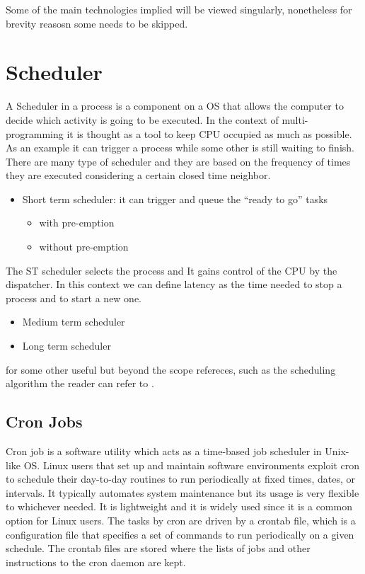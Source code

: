 \documentclass[
  12pt,
  a4paper,
  oneside]{book}
\providecommand{\tightlist}{%
  \setlength{\itemsep}{0pt}\setlength{\parskip}{0pt}}
\begin{document}
Some of the main technologies implied will be viewed singularly, nonetheless for brevity reasosn some needs to be skipped.

\hypertarget{scheduler}{%
\section{Scheduler}\label{scheduler}}

A Scheduler in a process is a component on a OS that allows the computer to decide which activity is going to be executed. In the context of multi-programming it is thought as a tool to keep CPU occupied as much as possible. As an example it can trigger a process while some other is still waiting to finish. There are many type of scheduler and they are based on the frequency of times they are executed considering a certain closed time neighbor.

\begin{itemize}
\tightlist
\item
  Short term scheduler: it can trigger and queue the ``ready to go'' tasks

  \begin{itemize}
  \tightlist
  \item
    with pre-emption
  \item
    without pre-emption
  \end{itemize}
\end{itemize}

The ST scheduler selects the process and It gains control of the CPU by the dispatcher. In this context we can define latency as the time needed to stop a process and to start a new one.

\begin{itemize}
\tightlist
\item
  Medium term scheduler
\item
  Long term scheduler
\end{itemize}

for some other useful but beyond the scope refereces, such as the scheduling algorithm the reader can refer to \citep{wiki:scheduler}.

\hypertarget{cron-jobs}{%
\subsection{Cron Jobs}\label{cron-jobs}}

Cron job is a software utility which acts as a time-based job scheduler in Unix-like OS. Linux users that set up and maintain software environments exploit cron to schedule their day-to-day routines to run periodically at fixed times, dates, or intervals. It typically automates system maintenance but its usage is very flexible to whichever needed. It is lightweight and it is widely used since it is a common option for Linux users.
The tasks by cron are driven by a crontab file, which is a configuration file that specifies a set of commands to run periodically on a given schedule. The crontab files are stored where the lists of jobs and other instructions to the cron daemon are kept.
\end{document}
